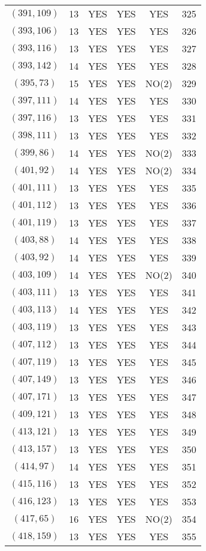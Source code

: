 \begin{longtable}{|c|c|c|c|c|c|}
$(391, 109)$ & 13 & YES & YES & YES & 325\\
$(393, 106)$ & 13 & YES & YES & YES & 326\\
$(393, 116)$ & 13 & YES & YES & YES & 327\\
$(393, 142)$ & 14 & YES & YES & YES & 328\\
$(395, 73)$ & 15 & YES & YES & NO(2) & 329\\
$(397, 111)$ & 14 & YES & YES & YES & 330\\
$(397, 116)$ & 13 & YES & YES & YES & 331\\
$(398, 111)$ & 13 & YES & YES & YES & 332\\
$(399, 86)$ & 14 & YES & YES & NO(2) & 333\\
$(401, 92)$ & 14 & YES & YES & NO(2) & 334\\
$(401, 111)$ & 13 & YES & YES & YES & 335\\
$(401, 112)$ & 13 & YES & YES & YES & 336\\
$(401, 119)$ & 13 & YES & YES & YES & 337\\
$(403, 88)$ & 14 & YES & YES & YES & 338\\
$(403, 92)$ & 14 & YES & YES & YES & 339\\
$(403, 109)$ & 14 & YES & YES & NO(2) & 340\\
$(403, 111)$ & 13 & YES & YES & YES & 341\\
$(403, 113)$ & 14 & YES & YES & YES & 342\\
$(403, 119)$ & 13 & YES & YES & YES & 343\\
$(407, 112)$ & 13 & YES & YES & YES & 344\\
$(407, 119)$ & 13 & YES & YES & YES & 345\\
$(407, 149)$ & 13 & YES & YES & YES & 346\\
$(407, 171)$ & 13 & YES & YES & YES & 347\\
$(409, 121)$ & 13 & YES & YES & YES & 348\\
$(413, 121)$ & 13 & YES & YES & YES & 349\\
$(413, 157)$ & 13 & YES & YES & YES & 350\\
$(414, 97)$ & 14 & YES & YES & YES & 351\\
$(415, 116)$ & 13 & YES & YES & YES & 352\\
$(416, 123)$ & 13 & YES & YES & YES & 353\\
$(417, 65)$ & 16 & YES & YES & NO(2) & 354\\
$(418, 159)$ & 13 & YES & YES & YES & 355\\

\end{longtable}
